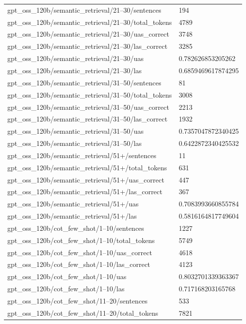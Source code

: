 \begin{tabular}{ll}
gpt\_oss\_120b/semantic\_retrieval/21–30/sentences & 194 \\
gpt\_oss\_120b/semantic\_retrieval/21–30/total\_tokens & 4789 \\
gpt\_oss\_120b/semantic\_retrieval/21–30/uas\_correct & 3748 \\
gpt\_oss\_120b/semantic\_retrieval/21–30/las\_correct & 3285 \\
gpt\_oss\_120b/semantic\_retrieval/21–30/uas & 0.782626853205262 \\
gpt\_oss\_120b/semantic\_retrieval/21–30/las & 0.6859469617874295 \\
gpt\_oss\_120b/semantic\_retrieval/31–50/sentences & 81 \\
gpt\_oss\_120b/semantic\_retrieval/31–50/total\_tokens & 3008 \\
gpt\_oss\_120b/semantic\_retrieval/31–50/uas\_correct & 2213 \\
gpt\_oss\_120b/semantic\_retrieval/31–50/las\_correct & 1932 \\
gpt\_oss\_120b/semantic\_retrieval/31–50/uas & 0.7357047872340425 \\
gpt\_oss\_120b/semantic\_retrieval/31–50/las & 0.6422872340425532 \\
gpt\_oss\_120b/semantic\_retrieval/51+/sentences & 11 \\
gpt\_oss\_120b/semantic\_retrieval/51+/total\_tokens & 631 \\
gpt\_oss\_120b/semantic\_retrieval/51+/uas\_correct & 447 \\
gpt\_oss\_120b/semantic\_retrieval/51+/las\_correct & 367 \\
gpt\_oss\_120b/semantic\_retrieval/51+/uas & 0.7083993660855784 \\
gpt\_oss\_120b/semantic\_retrieval/51+/las & 0.5816164817749604 \\
gpt\_oss\_120b/cot\_few\_shot/1–10/sentences & 1227 \\
gpt\_oss\_120b/cot\_few\_shot/1–10/total\_tokens & 5749 \\
gpt\_oss\_120b/cot\_few\_shot/1–10/uas\_correct & 4618 \\
gpt\_oss\_120b/cot\_few\_shot/1–10/las\_correct & 4123 \\
gpt\_oss\_120b/cot\_few\_shot/1–10/uas & 0.8032701339363367 \\
gpt\_oss\_120b/cot\_few\_shot/1–10/las & 0.717168203165768 \\
gpt\_oss\_120b/cot\_few\_shot/11–20/sentences & 533 \\
gpt\_oss\_120b/cot\_few\_shot/11–20/total\_tokens & 7821 \\

\end{tabular}

